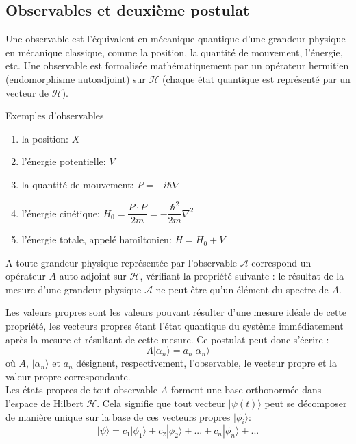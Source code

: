 \subsection{Observables et deuxième postulat}
Une observable est l'équivalent en mécanique quantique d'une grandeur physique en mécanique classique, comme la position, la quantité de mouvement, l'énergie, etc. Une observable est formalisée mathématiquement par un opérateur hermitien (endomorphisme autoadjoint) sur $\mathcal{H}$ (chaque état quantique est représenté par un vecteur de $\mathcal{H}$). 
\begin{ex}
	Exemples d'observables
	\begin{enumerate}
		\item la position: $X$
		\item l'énergie potentielle: $V$
		\item la quantité de mouvement: $P=-i\hbar \nabla$
		\item l'énergie cinétique:
		$H_0=\dfrac{P \cdot P}{2m}=-\dfrac{\hbar ^{2}}{2m}\nabla^{2}$
		\item l'énergie totale, appelé hamiltonien:
		$H=H_0+V$
	\end{enumerate}
\end{ex}
\begin{Post}
	A toute grandeur physique représentée par l'observable $\mathcal{A}$ correspond un opérateur $A$ auto-adjoint sur $\mathcal{H}$, vérifiant la propriété suivante : le résultat de la mesure d’une grandeur physique $\mathcal{A}$ ne peut être qu’un élément du spectre de $A$.
\end{Post}
Les valeurs propres sont les valeurs pouvant résulter d'une mesure idéale de cette propriété, les vecteurs propres étant l'état quantique du système immédiatement après la mesure et résultant de cette mesure. Ce postulat peut donc s'écrire :
$$
A|\alpha _{n}\rangle =a_{n}|\alpha _{n}\rangle 
$$
où $A$, $|\alpha_{n}\rangle$ et $a_n$ désignent, respectivement, l'observable, le vecteur propre et la valeur propre correspondante.\\
Les états propres de tout observable $A$ forment une base orthonormée dans l'espace de Hilbert $\mathcal{H}$.
Cela signifie que tout vecteur $|\psi (t)\rangle$ peut se décomposer de manière unique sur la base de ces vecteurs propres $|\phi_{i}\rangle$:
$$
|\psi \rangle =c_{1}|\phi _{1}\rangle +c_{2}|\phi _{2}\rangle +...+c_{n}|\phi _{n}\rangle +...
$$
